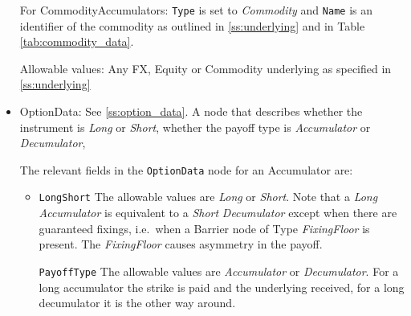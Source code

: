 \begin{itemize}
For CommodityAccumulators: \lstinline!Type! is set to \emph{Commodity} and \lstinline!Name! is an identifier of the commodity as outlined in \ref{ss:underlying} and in Table \ref{tab:commodity_data}.

    Allowable values: Any FX, Equity or Commodity underlying as specified in \ref{ss:underlying}
    
\item OptionData: See \ref{ss:option_data}. A node that describes whether the instrument is \emph{Long} or \emph{Short}, whether the payoff type is \emph{Accumulator} or \emph{Decumulator},  

The relevant fields in the \lstinline!OptionData! node for an Accumulator are:

\begin{itemize}
\item \lstinline!LongShort! The allowable values are \emph{Long} or \emph{Short}. Note that a \emph{Long} \emph{Accumulator} is equivalent to a \emph{Short} \emph{Decumulator} except when there are guaranteed fixings, i.e.\ when a Barrier node of Type \emph{FixingFloor} is present. The \emph{FixingFloor} causes asymmetry in the payoff.  

\lstinline!PayoffType! The allowable values are \emph{Accumulator} or \emph{Decumulator}. For a long accumulator the strike is paid and the underlying received, for a long decumulator it is the other way around.

\end{itemize}
    

\end{itemize}
